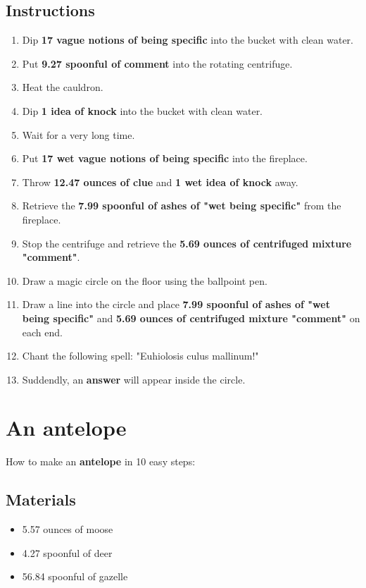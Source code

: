 \documentclass{article}
\begin{document}
\subsection{Instructions}\begin{enumerate}
\item 
Dip \textbf{17 vague notions of being specific} into the bucket with clean water.
\item 
Put \textbf{9.27 spoonful of comment} into the rotating centrifuge.
\item 
Heat the cauldron.
\item 
Dip \textbf{1 idea of knock} into the bucket with clean water.
\item 
Wait for a very long time.
\item 
Put \textbf{17 wet vague notions of being specific} into the fireplace.
\item 
Throw \textbf{12.47 ounces of clue} and \textbf{1 wet idea of knock} away.
\item 
Retrieve the \textbf{7.99 spoonful of ashes of "wet being specific"} from the fireplace.
\item 
Stop the centrifuge and retrieve the \textbf{5.69 ounces of centrifuged mixture "comment"}.
\item 
Draw a magic circle on the floor using the ballpoint pen.
\item 
Draw a line into the circle and place \textbf{7.99 spoonful of ashes of "wet being specific"} and \textbf{5.69 ounces of centrifuged mixture "comment"} on each end.
\item 
Chant the following spell: "Euhiolosis culus mallinum!"
\item 
Suddendly, an \textbf{answer} will appear inside the circle.
\end{enumerate}
\newpage
\section{An antelope}How to make an \textbf{antelope} in 10 easy steps:

\subsection{Materials}\begin{itemize}
\item 
5.57 ounces of moose
\item 
4.27 spoonful of deer
\item 
56.84 spoonful of gazelle
\end{itemize}
\end{document}
